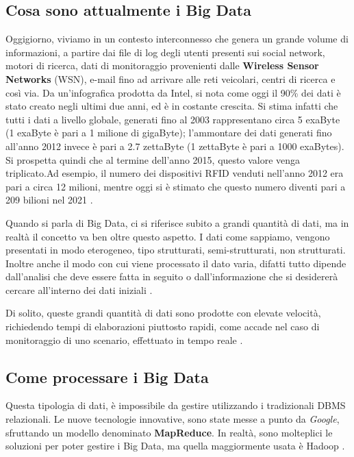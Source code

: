 \documentclass[11pt]{article}
\begin{document}
\subsection{Cosa sono attualmente i Big Data}
Oggigiorno, viviamo in un contesto interconnesso che genera un grande volume di informazioni, a partire dai file di log degli utenti presenti sui social network, motori di ricerca, dati di monitoraggio provenienti dalle \textbf{Wireless Sensor Networks} (WSN), e-mail fino ad arrivare alle reti veicolari, centri di ricerca e così via. Da un'infografica prodotta da Intel, si nota come oggi il 90\% dei dati è stato creato negli ultimi due anni, ed è in costante crescita. Si stima infatti che tutti i dati a livello globale, generati fino al 2003 rappresentano circa 5 exaByte (1 exaByte è pari a 1 milione di gigaByte); l'ammontare dei dati generati fino all'anno 2012 invece è pari a 2.7 zettaByte (1 zettaByte è pari a 1000 exaBytes). Si prospetta quindi che al termine dell'anno 2015, questo valore venga triplicato.Ad esempio, il numero dei dispositivi RFID venduti nell'anno 2012 era pari a circa 12 milioni, mentre oggi si è stimato che questo numero diventi pari a 209 bilioni nel 2021 \cite{6511732}.

Quando si parla di Big Data, ci si riferisce subito a grandi quantità di dati, ma in realtà il concetto va ben oltre questo aspetto. I dati come sappiamo, vengono presentati in modo eterogeneo, tipo strutturati, semi-strutturati, non strutturati. Inoltre anche il modo con cui viene processato il dato varia, difatti tutto dipende dall'analisi che deve essere fatta in seguito o dall'informazione che si desidererà cercare all'interno dei dati iniziali \cite{6511732}. 

Di solito, queste grandi quantità di dati sono prodotte con elevate velocità, richiedendo tempi di elaborazioni piuttosto rapidi, come accade nel caso di monitoraggio di uno scenario, effettuato in tempo reale \cite{6511732}.

\subsection{Come processare i Big Data}
Questa tipologia di dati, è impossibile da gestire utilizzando i tradizionali DBMS relazionali. Le nuove tecnologie innovative, sono state messe a punto da \emph{Google}, sfruttando un modello denominato \textbf{MapReduce}. In realtà, sono molteplici le soluzioni per poter gestire i Big Data, ma quella maggiormente usata è Hadoop \cite{6511732} \cite{hadoop}.
\end{document}
